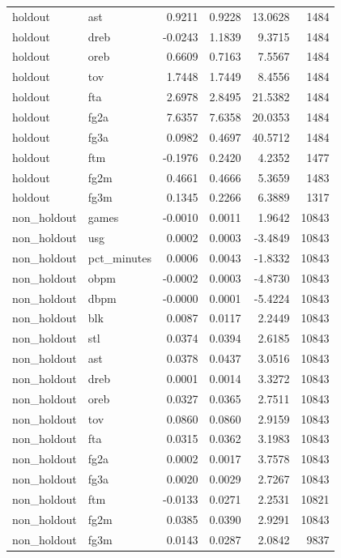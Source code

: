 \begin{table}
\begin{tabular}{llrrrr}
holdout & ast & 0.9211 & 0.9228 & 13.0628 & 1484 \\
holdout & dreb & -0.0243 & 1.1839 & 9.3715 & 1484 \\
holdout & oreb & 0.6609 & 0.7163 & 7.5567 & 1484 \\
holdout & tov & 1.7448 & 1.7449 & 8.4556 & 1484 \\
holdout & fta & 2.6978 & 2.8495 & 21.5382 & 1484 \\
holdout & fg2a & 7.6357 & 7.6358 & 20.0353 & 1484 \\
holdout & fg3a & 0.0982 & 0.4697 & 40.5712 & 1484 \\
holdout & ftm & -0.1976 & 0.2420 & 4.2352 & 1477 \\
holdout & fg2m & 0.4661 & 0.4666 & 5.3659 & 1483 \\
holdout & fg3m & 0.1345 & 0.2266 & 6.3889 & 1317 \\
non\_holdout & games & -0.0010 & 0.0011 & 1.9642 & 10843 \\
non\_holdout & usg & 0.0002 & 0.0003 & -3.4849 & 10843 \\
non\_holdout & pct\_minutes & 0.0006 & 0.0043 & -1.8332 & 10843 \\
non\_holdout & obpm & -0.0002 & 0.0003 & -4.8730 & 10843 \\
non\_holdout & dbpm & -0.0000 & 0.0001 & -5.4224 & 10843 \\
non\_holdout & blk & 0.0087 & 0.0117 & 2.2449 & 10843 \\
non\_holdout & stl & 0.0374 & 0.0394 & 2.6185 & 10843 \\
non\_holdout & ast & 0.0378 & 0.0437 & 3.0516 & 10843 \\
non\_holdout & dreb & 0.0001 & 0.0014 & 3.3272 & 10843 \\
non\_holdout & oreb & 0.0327 & 0.0365 & 2.7511 & 10843 \\
non\_holdout & tov & 0.0860 & 0.0860 & 2.9159 & 10843 \\
non\_holdout & fta & 0.0315 & 0.0362 & 3.1983 & 10843 \\
non\_holdout & fg2a & 0.0002 & 0.0017 & 3.7578 & 10843 \\
non\_holdout & fg3a & 0.0020 & 0.0029 & 2.7267 & 10843 \\
non\_holdout & ftm & -0.0133 & 0.0271 & 2.2531 & 10821 \\
non\_holdout & fg2m & 0.0385 & 0.0390 & 2.9291 & 10843 \\
non\_holdout & fg3m & 0.0143 & 0.0287 & 2.0842 & 9837 \\
\bottomrule
\end{tabular}
\end{table}
